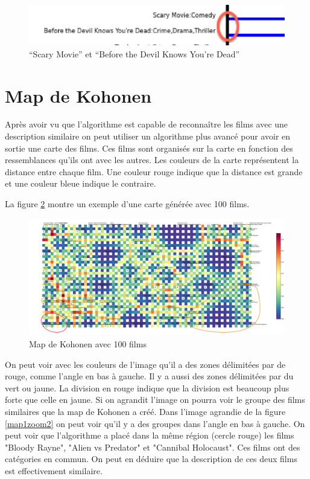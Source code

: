 \begin{figure}[h]
  \centering
    \includegraphics[width=0.5\linewidth]{img/scarymovie.png}
  \caption{``Scary Movie'' et ``Before the Devil Knows You're Dead''}
  \label{scarymovie}
\end{figure}



\section{Map de Kohonen}

Après avoir vu que l'algorithme est capable de reconnaître les films avec une description similaire on peut utiliser un algorithme plus avancé pour avoir en sortie une carte des films. Ces films sont organisés sur la carte en fonction des ressemblances qu'ils ont avec les autres. Les couleurs de la carte représentent la distance entre chaque film. Une couleur rouge indique que la distance est grande et une couleur bleue indique le contraire.

La figure \ref{map1} montre un exemple d'une carte générée avec 100 films.

\begin{figure}[h]
  \centering
  \includegraphics[width=1\linewidth]{img/map-cluster.png}
  \caption{Map de Kohonen avec 100 films}
  \label{map1}
\end{figure}

On peut voir avec les couleurs de l'image qu'il a des zones délimitées par de rouge, comme l'angle en bas à gauche. Il y a aussi des zones délimitées par du vert ou jaune. La division en rouge indique que la division est beaucoup plus forte que celle en jaune. Si on agrandit l'image on pourra voir le groupe des films similaires que la map de Kohonen a créé.
Dans l'image agrandie de la figure \ref{map1zoom2} on peut voir qu'il y a des groupes dans l'angle en bas à gauche. On peut voir que l'algorithme a placé dans la même région (cercle rouge) les films "Bloody Rayne", "Alien vs Predator" et "Cannibal Holocaust". Ces films ont des catégories en commun. On peut en déduire que la description de ces deux films est effectivement similaire.

